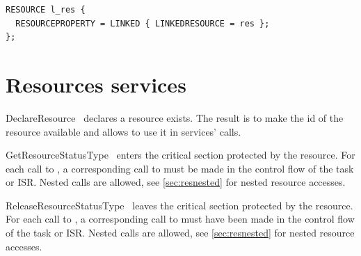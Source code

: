 \begin{lstlisting}[language=OIL]
RESOURCE l_res {
  RESOURCEPROPERTY = LINKED { LINKEDRESOURCE = res };
};
\end{lstlisting}


\section{Resources services}

\begin{service}{DeclareResource}{}
\servicename\ declares a resource exists. The result is to make the id of the resource available and allows to use it in services' calls.

\end{service}

\begin{service}{GetResource}{StatusType}
\servicename\ enters the critical section protected by the resource. For each call to \servicename, a corresponding call to  must be made in the control flow of the task or ISR. Nested calls are allowed, see \ref{sec:resnested} for nested resource accesses.
\end{service}

\begin{service}{ReleaseResource}{StatusType}
\servicename\ leaves the critical section protected by the resource. For each call to \servicename, a corresponding call to  must have been made in the control flow of the task or ISR. Nested calls are allowed, see \ref{sec:resnested} for nested resource accesses.



\end{service}